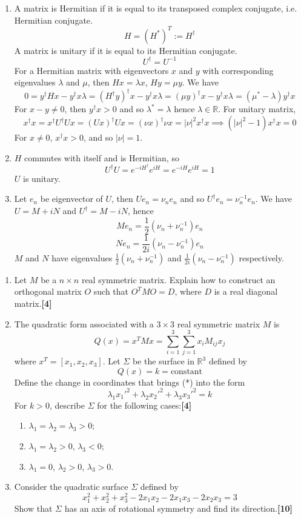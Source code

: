 \documentclass[a4paper]{article}
\begin{document}
\begin{ans}\leavevmode
\begin{enumerate}[label=(\roman*)]
\item A matrix is Hermitian if it is equal to its transposed complex conjugate, i.e. Hermitian conjugate.
$$H=(H^*)^T:=H^\dag$$
A matrix is unitary if it is equal to its Hermitian conjugate.
$$U^\dag=U^{-1}$$
For a Hermitian matrix with eigenvectors $x$ and $y$ with corresponding eigenvalues $\lambda$ and $\mu$, then $Hx=\lambda x$, $Hy=\mu y$. We have
$$0=y^\dag Hx-y^\dag x\lambda=(H^\dag y)^\dag x-y^\dag x\lambda=(\mu y)^\dag x-y^\dag x\lambda=(\mu^*-\lambda)y^\dag x$$
For $x-y\neq 0$, then $y^\dag x>0$ and so $\lambda^*=\lambda$ hence $\lambda\in\mathbb{R}$. For unitary matrix,
$$x^\dag x=x^\dag U^\dag Ux=(Ux)^\dag Ux=(\nu x)^\dag \nu x=|\nu|^2x^\dag x\implies(|\nu|^2-1)x^\dag x=0$$
For $x\neq0$, $x^\dag x>0$, and so $|\nu|=1$.
\item $H$ commutes with itself and is Hermitian, so
$$U^\dag U=e^{-iH^\dag}e^{iH}=e^{-iH}e^{iH}=1$$
$U$ is unitary.
\item Let $e_n$ be eigenvector of $U$, then $Ue_n=\nu_ne_n$ and so $U^\dag e_n=\nu_n^{-1}e_n$. We have $U=M+iN$ and $U^\dag=M-iN$, hence
$$Me_n=\frac{1}{2}(\nu_n+\nu_n^{-1})e_n$$
$$Ne_n=\frac{1}{2i}(\nu_n-\nu_n^{-1})e_n$$
$M$ and $N$ have eigenvalues $\frac{1}{2}(\nu_n+\nu_n^{-1})$ and $\frac{1}{2i}(\nu_n-\nu_n^{-1})$ respectively.
\end{enumerate}
\end{ans}
\newpage
\begin{qns}\leavevmode
\begin{enumerate}[label=(\roman*)]
\item Let $M$ be a $n\times n$ real symmetric matrix. Explain how to construct an orthogonal matrix $O$ such that $O^TMO=D$, where $D$ is a real diagonal matrix.\hfill \textbf{[4]}
\item The quadratic form associated with a $3\times3$ real symmetric matrix $M$ is
$$Q(x)=x^TMx=\sum_{i=1}^3\sum_{j=1}^3x_iM_{ij}x_j$$
where $x^T=[x_1,x_2,x_3]$. Let $\Sigma$ be the surface in $\mathbb{R}^3$ defined by 
\begin{equation}Q(x)=k=\text{constant}\tag{*}
\end{equation}
Define the change in coordinates that brings (*) into the form $$\lambda_1x_1'^2+\lambda_2x_2'^2+\lambda_3x_3'^2=k$$ 
For $k>0$, describe $\Sigma$ for the following cases:\hfill \textbf{[4]}
\begin{enumerate}[label=(\alph*)]
    \item $\lambda_1=\lambda_2=\lambda_3>0$;
    \item $\lambda_1=\lambda_2>0$, $\lambda_3<0$;
    \item $\lambda_1=0$, $\lambda_2>0$, $\lambda_3>0$.
\end{enumerate}
\item Consider the quadratic surface $\Sigma$ defined by
$$x^2_1 + x_2^2 + x^2_3 − 2x_1x_2 − 2x_1x_3 − 2x_2x_3 = 3$$
Show that $\Sigma$ has an axis of rotational symmetry and find its direction.\hfill \textbf{[10]}
\end{enumerate}
\end{qns}
\end{document}
